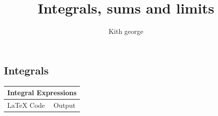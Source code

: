 \documentclass{article}
\title{Integrals, sums and limits}
\author{Kith george}
\begin{document}
	\maketitle
	
	\subsection*{Integrals}
	\begin{tabular}{|l|l|}
		\hline 
		\multicolumn{2}{|c|}{Integral Expressions} \\
		\hline
		LaTeX Code &Output \\
		
		
	\end{tabular}
\end{document}
